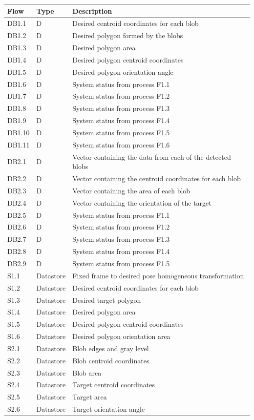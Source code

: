 \begin{table}[!htb]
	\centering
	\begin{tabular}{lll}
		\toprule
		Flow & Type & Description \\
		\midrule
		DB1.1 & D & Desired centroid coordinates for each blob\\
		DB1.2 & D & Desired polygon formed by the blobs \\
		DB1.3 & D & Desired polygon area\\
		DB1.4 & D & Desired polygon centroid coordinates\\
		DB1.5 & D & Desired polygon orientation angle \\
		DB1.6 & D & System status from process F1.1 \\
		DB1.7 & D & System status from process F1.2 \\
		DB1.8 & D & System status from process F1.3 \\
		DB1.9 & D & System status from process F1.4 \\
		DB1.10 & D & System status from process F1.5 \\
		DB1.11 & D & System status from process F1.6 \\
		\midrule
		DB2.1 & D & Vector containing the data from each of the detected blobs \\
		DB2.2 & D & Vector containing the centroid coordinates for each blob \\
		DB2.3 & D & Vector containing the area of each blob \\
		DB2.4 & D & Vector containing the orientation of the target \\
		DB2.5 & D & System status from process F1.1 \\
		DB2.6 & D & System status from process F1.2 \\
		DB2.7 & D & System status from process F1.3 \\
		DB2.8 & D & System status from process F1.4 \\
		DB2.9 & D & System status from process F1.5 \\
		\midrule
		S1.1 & Datastore & Fixed frame to desired pose homogeneous transformation \\
		S1.2 & Datastore & Desired centroid coordinates for each blob \\
		S1.3 & Datastore & Desired target polygon \\
		S1.4 & Datastore & Desired polygon area \\
		S1.5 & Datastore & Desired polygon centroid coordinates \\
		S1.6 & Datastore & Desired polygon orientation area \\
		S2.1 & Datastore & Blob edges and gray level \\
		S2.2 & Datastore & Blob centroid coordinates \\
		S2.3 & Datastore & Blob area \\
		S2.4 & Datastore & Target centroid coordinates \\
		S2.5 & Datastore & Target area \\
		S2.6 & Datastore & Target orientation angle \\
	

\end{tabular}
\end{table}
